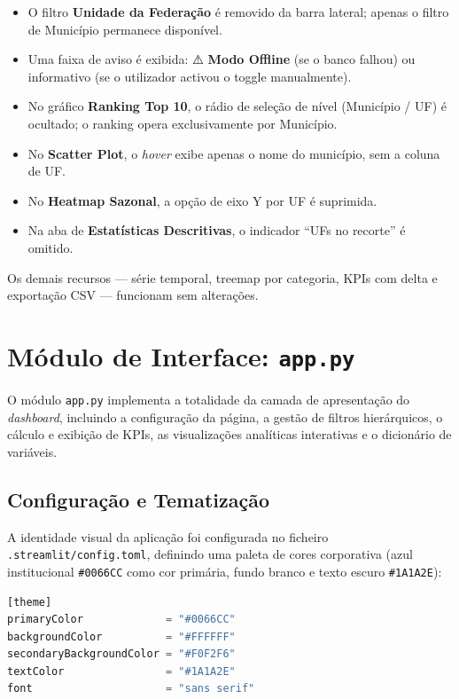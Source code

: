 \documentclass[12pt,a4paper]{report}
\begin{document}
\begin{itemize}
    \item O filtro \textbf{Unidade da Federação} é removido da barra lateral; apenas
    o filtro de Município permanece disponível.
    \item Uma faixa de aviso é exibida: ⚠️ \textbf{Modo Offline} (se o banco falhou)
    ou 📁 informativo (se o utilizador activou o toggle manualmente).
    \item No gráfico \textbf{Ranking Top 10}, o rádio de seleção de nível
    (Município / UF) é ocultado; o ranking opera exclusivamente por Município.
    \item No \textbf{Scatter Plot}, o \textit{hover} exibe apenas o nome do município,
    sem a coluna de UF.
    \item No \textbf{Heatmap Sazonal}, a opção de eixo Y por UF é suprimida.
    \item Na aba de \textbf{Estatísticas Descritivas}, o indicador
    ``UFs no recorte'' é omitido.
\end{itemize}

Os demais recursos — série temporal, treemap por categoria, KPIs com delta e
exportação CSV — funcionam sem alterações.

\section{Módulo de Interface: \texttt{app.py}}

O módulo \texttt{app.py} implementa a totalidade da camada de apresentação do
\textit{dashboard}, incluindo a configuração da página, a gestão de filtros
hierárquicos, o cálculo e exibição de KPIs, as visualizações analíticas interativas
e o dicionário de variáveis.

\subsection{Configuração e Tematização}

A identidade visual da aplicação foi configurada no ficheiro
\texttt{.streamlit/config.toml}, definindo uma paleta de cores corporativa (azul
institucional \texttt{\#0066CC} como cor primária, fundo branco e texto escuro
\texttt{\#1A1A2E}):

\begin{lstlisting}[language=Python, numbers=none]
[theme]
primaryColor             = "#0066CC"
backgroundColor          = "#FFFFFF"
secondaryBackgroundColor = "#F0F2F6"
textColor                = "#1A1A2E"
font                     = "sans serif"
\end{lstlisting}
\end{document}
